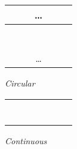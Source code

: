 \documentclass[a4paper,10pt]{article} \usepackage{anysize}
\begin{document}
\vspace{1.1em}
\begin{minipage}[t]{0.5\textwidth}
    \centering
        \begin{tabular}{| c | c | c | c | c | c | c |}
            \multicolumn{7}{c}{\dots} \\
            \hline
            \rowcolor{bootblue} & & & & & & \\
            \hline
            \rowcolor{bootgreen} & & & & & & \\
            \hline
            \rowcolor{bootred} & & & & & & \\
            \hline
            \rowcolor{bootblue} & & & & & & \\
            \hline
            \rowcolor{bootgreen} & & & & & & \\
            \hline
            \rowcolor{bootred} & & & & & & \\
            \hline
            \rowcolor{bootblue} & & & & & & \\
            \hline
            \multicolumn{7}{c}{\dots} \\
        \end{tabular}

        \textit{Circular}
\end{minipage}
\begin{minipage}[t]{0.5\textwidth}
    \centering
        \begin{tabular}{| c | c | c | c | c | c | c |}
            \hline
            \rowcolor{bootblue} & & & & & & \\
            \hline
            \rowcolor{bootblue} & & & & & & \\
            \hline
            \rowcolor{bootblue} & & & & & & \\
            \hline
            \rowcolor{bootgreen} & & & & & & \\
            \hline
            \rowcolor{bootgreen} & & & & & & \\
            \hline
            \rowcolor{bootgreen} & & & & & & \\
            \hline
            \rowcolor{bootred} & & & & & & \\
            \hline
            \rowcolor{bootred} & & & & & & \\
            \hline
        \end{tabular}

        \textit{Continuous}
\end{minipage}
\end{document}
